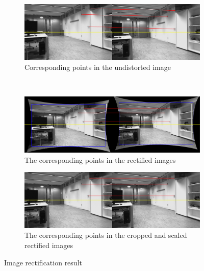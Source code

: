 \documentclass[11pt]{article}
\begin{document}
\begin{figure}[H]
        \centering
        \begin{subfigure}[b]{0.9\textwidth}
                \includegraphics[width=\textwidth]{images/undistort}
                \caption{Corresponding points in the undistorted image}
                \label{fig:rect_1}
        \end{subfigure}\\
        \begin{subfigure}[b]{0.9\textwidth}
                \includegraphics[width=\textwidth]{images/rect_uncropped}
                \caption{The corresponding points in the rectified images}
                \label{fig:rect_2}
        \end{subfigure}

       \begin{subfigure}[b]{0.9\textwidth}
                \includegraphics[width=\textwidth]{images/rect_cropped}
                \caption{The corresponding points in the cropped and scaled rectified images}
                \label{fig:rect_3}
        \end{subfigure}
         \caption{Image rectification result }\label{fig:rectification}
\end{figure}
\end{document}
